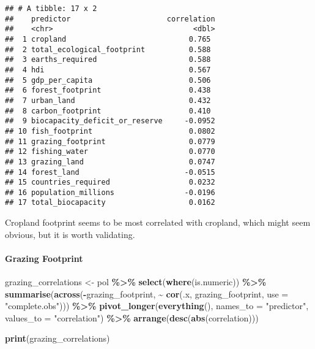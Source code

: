\documentclass[
]{article}
\newenvironment{Shaded}{\begin{snugshade}}{\end{snugshade}}
\newcommand{\AttributeTok}[1]{\textcolor[rgb]{0.13,0.29,0.53}{#1}}
\newcommand{\FunctionTok}[1]{\textcolor[rgb]{0.13,0.29,0.53}{\textbf{#1}}}
\newcommand{\NormalTok}[1]{#1}
\newcommand{\OtherTok}[1]{\textcolor[rgb]{0.56,0.35,0.01}{#1}}
\newcommand{\SpecialCharTok}[1]{\textcolor[rgb]{0.81,0.36,0.00}{\textbf{#1}}}
\newcommand{\StringTok}[1]{\textcolor[rgb]{0.31,0.60,0.02}{#1}}
\begin{document}
\begin{verbatim}
## # A tibble: 17 x 2
##    predictor                      correlation
##    <chr>                                <dbl>
##  1 cropland                            0.765 
##  2 total_ecological_footprint          0.588 
##  3 earths_required                     0.588 
##  4 hdi                                 0.567 
##  5 gdp_per_capita                      0.506 
##  6 forest_footprint                    0.438 
##  7 urban_land                          0.432 
##  8 carbon_footprint                    0.410 
##  9 biocapacity_deficit_or_reserve     -0.0952
## 10 fish_footprint                      0.0802
## 11 grazing_footprint                   0.0779
## 12 fishing_water                       0.0770
## 13 grazing_land                        0.0747
## 14 forest_land                        -0.0515
## 15 countries_required                  0.0232
## 16 population_millions                -0.0196
## 17 total_biocapacity                   0.0162
\end{verbatim}

Cropland footprint seems to be most correlated with cropland, which
might seem obvious, but it is worth validating.

\paragraph{Grazing Footprint}\label{grazing-footprint}

\begin{Shaded}
\begin{Highlighting}[]
\NormalTok{grazing\_correlations }\OtherTok{\textless{}{-}}\NormalTok{ pol }\SpecialCharTok{\%\textgreater{}\%}
  \FunctionTok{select}\NormalTok{(}\FunctionTok{where}\NormalTok{(is.numeric)) }\SpecialCharTok{\%\textgreater{}\%}
  \FunctionTok{summarise}\NormalTok{(}\FunctionTok{across}\NormalTok{(}\SpecialCharTok{{-}}\NormalTok{grazing\_footprint, }
                   \SpecialCharTok{\textasciitilde{}} \FunctionTok{cor}\NormalTok{(.x, grazing\_footprint, }\AttributeTok{use =} \StringTok{"complete.obs"}\NormalTok{))) }\SpecialCharTok{\%\textgreater{}\%}
  \FunctionTok{pivot\_longer}\NormalTok{(}\FunctionTok{everything}\NormalTok{(), }\AttributeTok{names\_to =} \StringTok{"predictor"}\NormalTok{, }\AttributeTok{values\_to =} \StringTok{"correlation"}\NormalTok{) }\SpecialCharTok{\%\textgreater{}\%}
  \FunctionTok{arrange}\NormalTok{(}\FunctionTok{desc}\NormalTok{(}\FunctionTok{abs}\NormalTok{(correlation)))}

\FunctionTok{print}\NormalTok{(grazing\_correlations)}
\end{Highlighting}
\end{Shaded}
\end{document}
